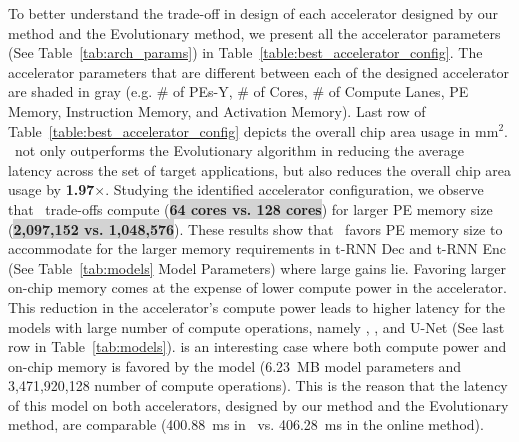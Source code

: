 %
To better understand the trade-off in design of each accelerator designed by our method and the Evolutionary method, we present all the accelerator parameters (See Table~\ref{tab:arch_params}) in Table~\ref{table:best_accelerator_config}.
%
The accelerator parameters that are different between each of the designed accelerator are shaded in gray (e.g. \# of PEs-Y, \# of Cores, \# of Compute Lanes, PE Memory, Instruction Memory, and Activation Memory).
%
Last row of Table~\ref{table:best_accelerator_config} depicts the overall chip area usage in mm$^2$. \primemethodname\ not only outperforms the Evolutionary algorithm in reducing the average latency across the set of target applications, but also reduces the overall chip area usage by \textbf{1.97$\times$}.
%
Studying the identified accelerator configuration, we observe that \primemethodname\ trade-offs compute (\colorbox{lightgray}{\textbf{64 cores vs. 128 cores}}) for larger PE memory size (\colorbox{lightgray}{\textbf{2,097,152 vs. 1,048,576}}). These results show that \primemethodname\ favors PE memory size to accommodate for the larger memory requirements in t-RNN Dec and t-RNN Enc (See Table~\ref{tab:models} Model Parameters) where large gains lie.
%
Favoring larger on-chip memory comes at the expense of lower compute power in the accelerator. This reduction in the accelerator's compute power leads to higher latency for the models with large number of compute operations, namely \mfive, \msix, and U-Net (See last row in Table~\ref{tab:models}).
%
\mfour is an interesting case where both compute power and on-chip memory is favored by the model (6.23~MB model parameters and 3,471,920,128 number of compute operations). This is the reason that the latency of this model on both accelerators, designed by our method and the Evolutionary method, are comparable (400.88~ms in \primemethodname\ vs. 406.28~ms in the online method).


